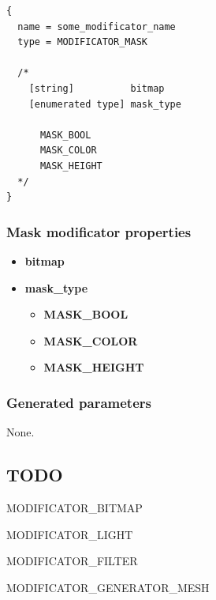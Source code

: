 \documentclass[9pt]{article}
\begin{document}
\begin{verbatim}
{
  name = some_modificator_name
  type = MODIFICATOR_MASK

  /*
    [string]          bitmap
    [enumerated type] mask_type
  
      MASK_BOOL
      MASK_COLOR
      MASK_HEIGHT
  */
}
\end{verbatim}
\subsubsection*{Mask modificator properties}
\begin{itemize}
\item{\bf bitmap}
\item{\bf mask\_type}
\begin{itemize}
\item{\bf MASK\_BOOL}
\item{\bf MASK\_COLOR}
\item{\bf MASK\_HEIGHT}
\end{itemize}
\end{itemize}

\subsubsection*{Generated parameters}

None.

\subsection{TODO}

MODIFICATOR\_BITMAP

MODIFICATOR\_LIGHT

MODIFICATOR\_FILTER

MODIFICATOR\_GENERATOR\_MESH
\end{document}
